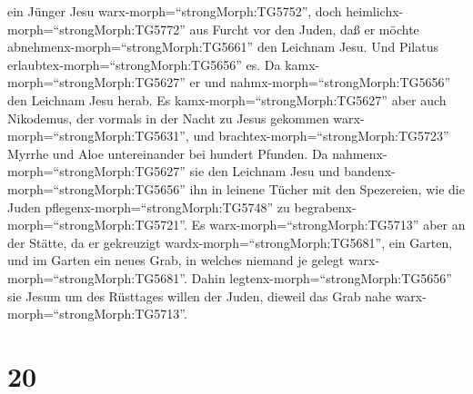 ein Jünger Jesu warx-morph=``strongMorph:TG5752'', doch
heimlichx-morph=``strongMorph:TG5772'' aus Furcht vor den Juden, daß er
möchte abnehmenx-morph=``strongMorph:TG5661'' den Leichnam Jesu. Und
Pilatus erlaubtex-morph=``strongMorph:TG5656'' es. Da
kamx-morph=``strongMorph:TG5627'' er und
nahmx-morph=``strongMorph:TG5656'' den Leichnam Jesu herab.
 Es kamx-morph=``strongMorph:TG5627'' aber auch Nikodemus,
der vormals in der Nacht zu Jesus gekommen
warx-morph=``strongMorph:TG5631'', und
brachtex-morph=``strongMorph:TG5723'' Myrrhe und Aloe untereinander bei
hundert Pfunden.  Da nahmenx-morph=``strongMorph:TG5627''
sie den Leichnam Jesu und bandenx-morph=``strongMorph:TG5656'' ihn in
leinene Tücher mit den Spezereien, wie die Juden
pflegenx-morph=``strongMorph:TG5748'' zu
begrabenx-morph=``strongMorph:TG5721''.  Es
warx-morph=``strongMorph:TG5713'' aber an der Stätte, da er gekreuzigt
wardx-morph=``strongMorph:TG5681'', ein Garten, und im Garten ein neues
Grab, in welches niemand je gelegt warx-morph=``strongMorph:TG5681''.
 Dahin legtenx-morph=``strongMorph:TG5656'' sie Jesum um
des Rüsttages willen der Juden, dieweil das Grab nahe
warx-morph=``strongMorph:TG5713''.

\hypertarget{section-19}{%
\section{20}\label{section-19}}

